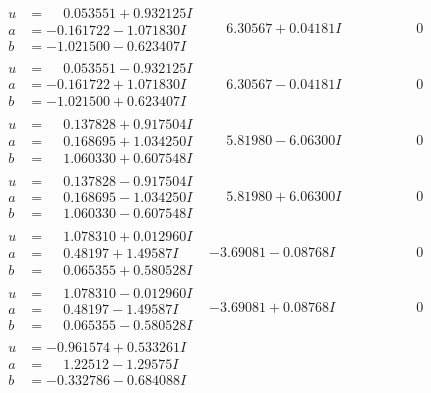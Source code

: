 \documentclass[1p]{elsarticle_modified}
\theoremstyle{definition}
\begin{document}
$$\begin{array}{c|c|c}
\begin{aligned}
u &= \phantom{-}0.053551 + 0.932125 I \\
a &= -0.161722 - 1.071830 I \\
b &= -1.021500 - 0.623407 I\end{aligned}
 & \phantom{-}6.30567 + 0.04181 I & \phantom{-0.000000 } 0 \\ \hline\begin{aligned}
u &= \phantom{-}0.053551 - 0.932125 I \\
a &= -0.161722 + 1.071830 I \\
b &= -1.021500 + 0.623407 I\end{aligned}
 & \phantom{-}6.30567 - 0.04181 I & \phantom{-0.000000 } 0 \\ \hline\begin{aligned}
u &= \phantom{-}0.137828 + 0.917504 I \\
a &= \phantom{-}0.168695 + 1.034250 I \\
b &= \phantom{-}1.060330 + 0.607548 I\end{aligned}
 & \phantom{-}5.81980 - 6.06300 I & \phantom{-0.000000 } 0 \\ \hline\begin{aligned}
u &= \phantom{-}0.137828 - 0.917504 I \\
a &= \phantom{-}0.168695 - 1.034250 I \\
b &= \phantom{-}1.060330 - 0.607548 I\end{aligned}
 & \phantom{-}5.81980 + 6.06300 I & \phantom{-0.000000 } 0 \\ \hline\begin{aligned}
u &= \phantom{-}1.078310 + 0.012960 I \\
a &= \phantom{-}0.48197 + 1.49587 I \\
b &= \phantom{-}0.065355 + 0.580528 I\end{aligned}
 & -3.69081 - 0.08768 I & \phantom{-0.000000 } 0 \\ \hline\begin{aligned}
u &= \phantom{-}1.078310 - 0.012960 I \\
a &= \phantom{-}0.48197 - 1.49587 I \\
b &= \phantom{-}0.065355 - 0.580528 I\end{aligned}
 & -3.69081 + 0.08768 I & \phantom{-0.000000 } 0 \\ \hline\begin{aligned}
u &= -0.961574 + 0.533261 I \\
a &= \phantom{-}1.22512 - 1.29575 I \\
b &= -0.332786 - 0.684088 I\end{aligned}

\end{array}$$
\end{document}
